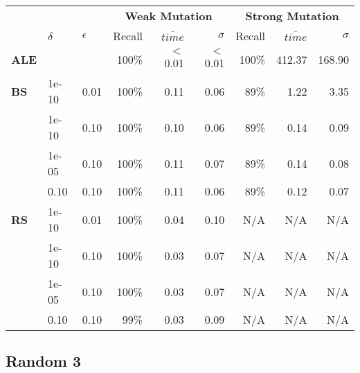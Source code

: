 \begin{small} 
\begin{tabular}{lll|r|r|r|r|r|r} 
 & & & \multicolumn{3}{c|}{\textbf{Weak Mutation}} & \multicolumn{3}{c}{\textbf{Strong Mutation}}\\ 
 & $\delta$ & $\epsilon$ & Recall & $\overline{time}$ & $\sigma$ & Recall & $\overline{time}$ & $\sigma$ \\  
\hline 
\textbf{ALE} & & & 100\% & $<$0.01  & $<$0.01  & 100\% & 412.37  & 168.90  \\ 
\textbf{BS}  & 1e-10  & 0.01  & 100\% & 0.11  & 0.06  & 89\% & 1.22  & 3.35\\
 & 1e-10  & 0.10  & 100\% & 0.10  & 0.06  & 89\% & 0.14  & 0.09\\
 & 1e-05  & 0.10  & 100\% & 0.11  & 0.07  & 89\% & 0.14  & 0.08\\
 & 0.10  & 0.10  & 100\% & 0.11  & 0.06  & 89\% & 0.12  & 0.07\\
\textbf{RS}  & 1e-10  & 0.01  & 100\% & 0.04  & 0.10 & N/A & N/A & N/A \\
 & 1e-10  & 0.10  & 100\% & 0.03  & 0.07 & N/A & N/A & N/A \\
 & 1e-05  & 0.10  & 100\% & 0.03  & 0.07 & N/A & N/A & N/A \\
 & 0.10  & 0.10  & 99\% & 0.03  & 0.09 & N/A & N/A & N/A \\
\end{tabular} 
\end{small}  


\subsection{Random 3}

